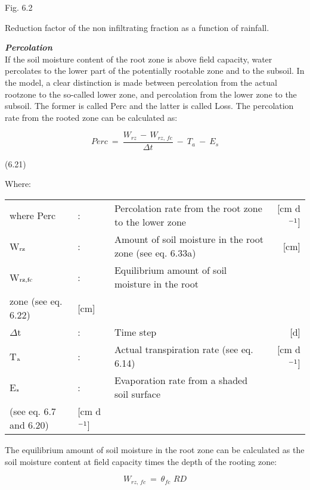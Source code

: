 Fig. 6.2 
\testlastline

\begin{indenting}{2.54cm}
Reduction factor of the non infiltrating fraction as a function of rainfall.
\end{indenting}



{\bf {\it Percolation\/}}\\
If the soil moisture content of the root zone is above field capacity, water percolates to
the lower part of the potentially rootable zone and to the subsoil. In the model, a clear
distinction is made between percolation from the actual rootzone to the so-called lower
zone, and percolation from the lower zone to the subsoil. The former is called Perc and
the latter is called Loss. The percolation rate from the rooted zone can be calculated as:

\begin{equation}
Perc  ~=~{\frac{W _{rz} \, -\, W _{rz,\, fc} }{\Delta t}} ~-~ T _{a} ~-~ E _{s} 
\end{equation}

 
\strut\hfill (6.21)

Where:\\
\begin{tabularx}{\textwidth}{llXr}



where Perc &:& Percolation rate from the root zone to the lower zone  & [cm d$^{{\rm -1}}$]\\
W$_{{\rm rz}}$ &:& Amount of soil moisture in the root zone (see eq. 6.33a)  & [cm]\\
W$_{{\rm rz,fc}}$ &:& Equilibrium amount of soil moisture in the root\\
   zone (see eq. 6.22)  & [cm]\\
$\Delta$t &:& Time step  & [d]\\
T$_{{\rm a}}$ &:& Actual transpiration rate (see eq. 6.14)  & [cm d$^{{\rm -1}}$]\\
E$_{{\rm s}}$ &:& Evaporation rate from a shaded soil surface \\
  (see eq. 6.7  and 6.20)  & [cm d$^{{\rm -1}}$]
\end{tabularx}
 The equilibrium amount of soil moisture in the root zone can be calculated as the soil
moisture content at field capacity times the depth of the rooting zone:

\begin{equation}
W _{rz,\, fc} ~=~ \theta  _{fc} \,\, RD
\end{equation}

